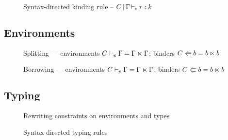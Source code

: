 \begin{figure}[ht]
  \centering
  
  \caption{Syntax-directed kinding rule --
    $C \operatorname{|} \Gamma \operatorname{\vdash_s} \tau : k$}
  \label{rules:sd-kinding}
\end{figure}

\subsection{Environments}
\label{typ:extra:envs}

\begin{figure}[tp]
  
  \caption{Splitting --- environments $C \vdash_e \Gamma = \Gamma \ltimes \Gamma$; binders $C \Lleftarrow b = b \ltimes b$}
  \label{fig:sd-splitting}
\end{figure}

\begin{figure}[tp]
  
  \caption{Borrowing --- environments $C \vdash_e \Gamma = \Gamma \ltimes \Gamma$; binders $C \Lleftarrow b = b \ltimes b$}
  \label{fig:sd-borrowing}
\end{figure}




\subsection{Typing}

\begin{figure*}[tp]
  
  \caption{Rewriting constraints on environments and types}
  \label{fig:contraints-environments-types}
\end{figure*}
\begin{figure*}[tp]
  
  \caption{Syntax-directed typing rules}
  \label{fig:syntax-directed-typing}
\end{figure*}


